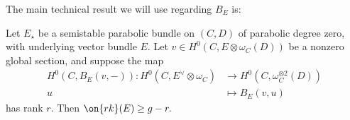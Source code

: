

The main technical result we will use regarding $B_E$ is:
\begin{proposition}
\notready\label{proposition:pairing-result}
	Let $E_\star$ be a semistable parabolic bundle on $(C,D)$ of parabolic
	degree zero, with underlying vector bundle $E$. Let $v\in H^0(C, E\otimes \omega_C(D))$ be a nonzero global section, and suppose the map
\begin{align*}
	H^0(C, B_E(v,-)): H^0(C, E^\vee \otimes \omega_C) & \rightarrow H^0(C, \omega_C^{\otimes 2}(D)) \\
	u & \mapsto B_E(v,u)
\end{align*}
has rank $r$. Then $\on{rk}(E)\geq g-r.$
\end{proposition}

